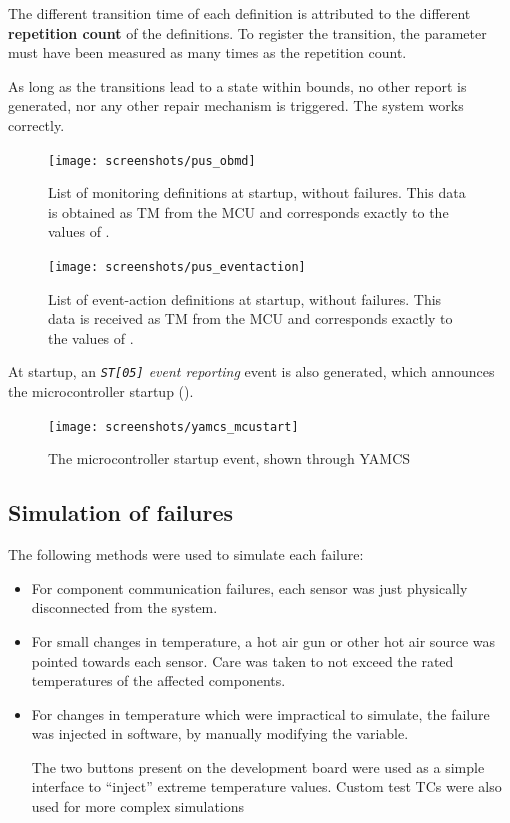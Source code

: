 \documentclass[a4paper,nobib]{tufte-book}
\begin{document}
The different transition time of each definition is attributed to the different \textbf{repetition count} of the definitions. To register the transition, the parameter must have been measured as many times as the repetition count.

As long as the transitions lead to a state within bounds, no other report is generated, nor any other repair mechanism is triggered. The system works correctly.

\begin{figure}[h]
	\texttt{[image: screenshots/pus\_obmd]}
	\caption[List of monitoring definitions at startup, without failures]{List of monitoring definitions at startup, without failures. This data is obtained as \acs{TM} from the \acs{MCU} and corresponds exactly to the values of .}
		\label{fig:pus_obmd}
\end{figure}
	
\begin{figure}[h]
	\texttt{[image: screenshots/pus\_eventaction]}
	\caption[List of event-action definitions]{List of event-action definitions at startup, without failures. This data is received as \acs{TM} from the \acs{MCU} and corresponds exactly to the values of .}
		\label{fig:pus_eventaction}
\end{figure}
		
At startup, an \emph{\texttt{ST[05]} event reporting} event is also generated, which announces the microcontroller startup ().
			
\begin{figure}[h]
	\centering
	\caption{The microcontroller startup event, shown through \acs{YAMCS}}
	\label{fig:yamcsmcustart}
	\texttt{[image: screenshots/yamcs\_mcustart]}
\end{figure}

\FloatBarrier
\subsection{Simulation of failures}
\label{sec:simul}

The following methods were used to simulate each failure:
\begin{itemize}
	\item For component communication failures, each sensor was just physically disconnected from the system.
	\item For small changes in temperature, a hot air gun or other hot air source was pointed towards each sensor. Care was taken to not exceed the rated temperatures of the affected components.
	\item For changes in temperature which were impractical to simulate, the failure was injected in software, by manually modifying the variable.
	
	The two buttons present on the development board were used as a simple interface to ``inject'' extreme temperature values. Custom test \acsp{TC} were also used for more complex simulations
\end{itemize}
\end{document}
